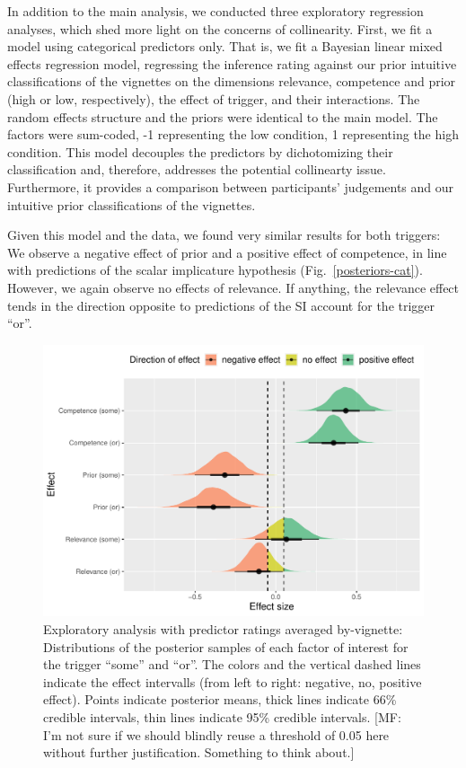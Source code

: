 \documentclass{sp}
\newcommand{\mf}[1]{\textcolor{BurntOrange}{[MF: #1]}}
\begin{document}
In addition to the main analysis, we conducted three exploratory regression analyses, which shed more light on the concerns of collinearity. First, we fit a model using categorical predictors only. That is, we fit a Bayesian linear mixed effects regression model, regressing the inference rating against our prior intuitive classifications of the vignettes on the dimensions relevance, competence and prior (high or low, respectively), the effect of trigger, and their interactions. The random effects structure and the priors were identical to the main model. The factors were sum-coded, -1 representing the low condition, 1 representing the high condition.
This model decouples the predictors by dichotomizing their classification and, therefore, addresses the potential collinearty issue. Furthermore, it provides a comparison between participants' judgements and our intuitive prior classifications of the vignettes. 

Given this model and the data, we found very similar results for both triggers: We observe a negative effect of prior and a positive effect of competence, in line with predictions of the scalar implicature hypothesis (Fig.~\ref{posteriors-cat}). However, we again observe no effects of relevance. If anything, the relevance effect tends in the direction opposite to predictions of the SI account for the trigger ``or''. 

\begin{figure}[h]
	\begin{center}
		\includegraphics[width=1\linewidth]{images/posterior-effects-means-noDupl.pdf}
	\end{center}
	\vspace{-0.3cm}
	\caption{Exploratory analysis with predictor ratings averaged by-vignette: Distributions of the posterior samples of each factor of interest for the trigger ``some'' and ``or''. The colors and the vertical dashed lines indicate the effect intervalls (from left to right: negative, no, positive effect). Points indicate posterior means, thick lines indicate 66\% credible intervals, thin lines indicate 95\% credible intervals. \mf{I'm not sure if we should blindly reuse a threshold of 0.05 here without further justification. Something to think about.}}
	\label{posteriors-mean}
\end{figure}
\end{document}
